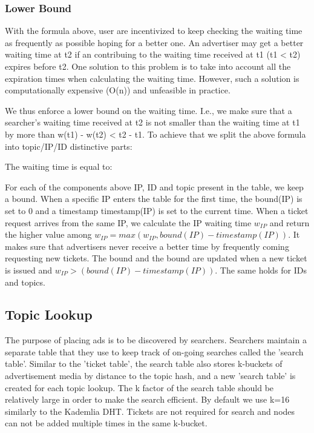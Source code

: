 \subsubsection{Lower Bound}

With the formula above, user are incentivized to keep checking the waiting time as frequently as possible hoping for a better one. An advertiser may get a better waiting time at t2 if an contribuing to the waiting time received at t1 (t1 < t2) expires before t2. One solution to this problem is to take into account all the expiration times when calculating the waiting time. However, such a solution is computationally expensive (O(n)) and unfeasible in practice.

We thus enforce a lower bound on the waiting time. I.e., we make sure that a searcher's waiting time received at t2 is not smaller than the waiting time at t1 by more than w(t1) - w(t2) < t2 - t1. To achieve that we split the above formula into topic/IP/ID distinctive parts:



The waiting time is equal to: 

For each of the components above IP, ID and topic present in the table, we keep a bound. When a specific IP enters the table for the first time, the bound(IP) is set to 0 and a timestamp timestamp(IP) is set to the current time. When a ticket request arrives from the same IP, we calculate the IP waiting time $w_{IP}$ and return the higher value among $w_{IP} = max(w_{IP}, bound(IP) - timestamp(IP))$. It makes sure that advertisers never receive a better time by frequently coming requesting new tickets. The bound and the bound are updated when a new ticket is issued and $w_{IP} > (bound(IP) - timestamp(IP))$. The same holds for IDs and topics.


\subsection{Topic Lookup}
The purpose of placing ads is to be discovered by searchers. Searchers maintain a separate table that they use to keep track of on-going searches called the 'search table'. Similar to the 'ticket table', the search table also stores k-buckets of advertisement media by distance to the topic hash, and a new 'search table' is created for each topic lookup. The k factor of the search table should be relatively large in order to make the search efficient. By default we use k=16 similarly to the Kademlia DHT. Tickets are not required for search and nodes can not be added multiple times in the same k-bucket.

